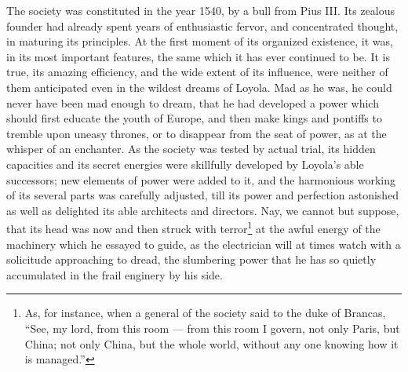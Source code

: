 \documentclass[]{book}
\let\rmarkdownfootnote\footnote%
\def\footnote{\protect\rmarkdownfootnote}
\begin{document}
The society was constituted in the year 1540, by a bull from Pius III. Its zealous founder had already spent years of enthusiastic fervor, and concentrated thought, in maturing its principles. At the first moment of its organized existence, it was, in its most important features, the same which it has ever continued to be. It is true, its amazing efficiency, and the wide extent of its influence, were neither of them anticipated even in the wildest dreams of Loyola. Mad as he was, he could never have been mad enough to dream, that he had developed a power which should first educate the youth of Europe, and then make kings and pontiffs to tremble upon uneasy thrones, or to disappear from the seat of power, as at the whisper of an enchanter. As the society was tested by actual trial, its hidden capacities and its secret energies were skillfully developed by Loyola's able successors; new elements of power were added to it, and the harmonious working of its several parts was carefully adjusted, till its power and perfection astonished as well as delighted its able architects and directors. Nay, we cannot but suppose, that its head was now and then struck with terror\footnote{As, for instance, when a general of the society said to the duke of Brancas, ``See, my lord, from this room --- from this room I govern, not only Paris, but China; not only China, but the whole world, without any one knowing how it is managed.''} at the awful energy of the machinery which he essayed to guide, as the electrician will at times watch with a solicitude approaching to dread, the slumbering power that he has so quietly accumulated in the frail enginery by his side.
\end{document}
